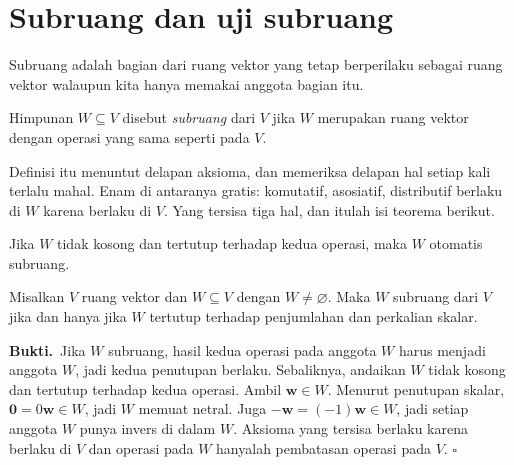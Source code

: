 \section{Subruang dan uji subruang}

Subruang adalah bagian dari ruang vektor yang tetap berperilaku sebagai ruang vektor walaupun
kita hanya memakai anggota bagian itu.

\begin{definisi}[Subruang]
Himpunan $W\subseteq V$ disebut \emph{subruang} dari $V$ jika $W$ merupakan ruang vektor
dengan operasi yang sama seperti pada $V$.
\end{definisi}

Definisi itu menuntut delapan aksioma, dan memeriksa delapan hal setiap kali terlalu mahal.
Enam di antaranya gratis: komutatif, asosiatif, distributif berlaku di $W$ karena berlaku di
$V$. Yang tersisa tiga hal, dan itulah isi teorema berikut.

Jika $W$ tidak kosong dan tertutup terhadap kedua operasi, maka $W$ otomatis subruang.

\begin{teorema}
Misalkan $V$ ruang vektor dan $W\subseteq V$ dengan $W\neq\varnothing$. Maka $W$ subruang
dari $V$ jika dan hanya jika $W$ tertutup terhadap penjumlahan dan perkalian skalar.
\end{teorema}

\par\medskip\noindent\textbf{Bukti.}\ 
Jika $W$ subruang, hasil kedua operasi pada anggota $W$ harus menjadi anggota $W$, jadi
kedua penutupan berlaku. Sebaliknya, andaikan $W$ tidak kosong dan tertutup terhadap kedua
operasi. Ambil $\mathbf{w}\in W$. Menurut penutupan skalar, $\mathbf{0}=0\mathbf{w}\in W$,
jadi $W$ memuat netral. Juga $-\mathbf{w}=(-1)\mathbf{w}\in W$, jadi setiap anggota $W$
punya invers di dalam $W$. Aksioma yang tersisa berlaku karena berlaku di $V$ dan operasi
pada $W$ hanyalah pembatasan operasi pada $V$.
\hfill$\square$\par\medskip

